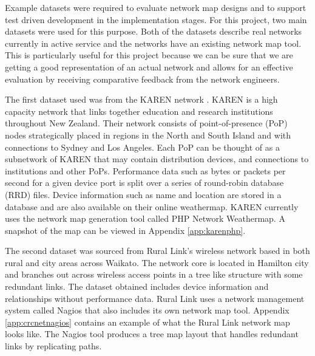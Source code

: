 \documentclass[11pt, a4paper]{article}
\begin{document}
Example datasets were required to evaluate network map designs and to support
test driven development in the implementation stages. For this project, two main
datasets were used for this purpose. Both of the datasets describe real networks
currently in active service and the networks have an existing network map tool.
This is particularly useful for this project because we can be sure that we are
getting a good representation of an actual network and allows for an effective
evaluation by receiving comparative feedback from the network engineers. 

The first dataset used was from the KAREN network \cite{KAREN_website}. KAREN is
a high capacity network that links together education and research institutions
throughout New Zealand. Their network consists of point-of-presence (PoP) nodes
strategically placed in regions in the North and South Island and with
connections to Sydney and Los Angeles. Each PoP can be thought of as a
subnetwork of KAREN that may contain distribution devices, and connections to
institutions and other PoPs.  Performance data such as bytes or packets per
second for a given device port is split over a series of round-robin database
(RRD) files. Device information such as name and location are stored in a
database and are also available on their online weathermap. KAREN currently uses
the network map generation tool called PHP Network Weathermap. A snapshot of the
map can be viewed in Appendix \ref{app:karenphp}.


The second dataset was sourced from Rural Link's wireless network based in both
rural and city areas across Waikato. The network core is located in Hamilton
city and branches out across wireless access points in a tree like structure
with some redundant links. The dataset obtained includes device information and
relationships without performance data. Rural Link uses a network management
system called Nagios that also includes its own network map tool. Appendix
\ref{app:crcnetnagios} contains an example of what the Rural Link network map
looks like. The Nagios tool produces a tree map layout that handles redundant
links by replicating paths.
\end{document}
